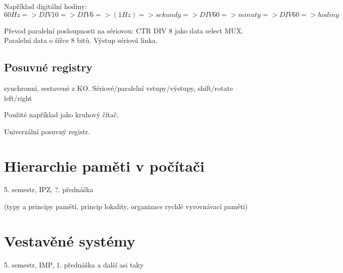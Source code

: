 \documentclass[a4paper, 11pt]{report}
\begin{document}
Například digitální hodiny: $60Hz => DIV 10 => DIV 6 => (1 Hz) => sekundy => DIV 60 => minuty => DIV 60 => hodiny$

Převod paralelní posloupnosti na sériovou: CTR DIV 8 jako data select MUX. Paralelní data o šířce 8 bitů. Výstup sériová linka.

\section{Posuvné registry}

synchronní, sestavené z KO. Sériové/paralelní vstupy/výstupy, shift/rotate left/right

Použité například jako kruhový čítač.

Univerzální posuvný registr.















\chapter{Hierarchie paměti v počítači} \label{cha:4}

5. semestr, IPZ, ?. přednáška

(typy a principy pamětí, princip lokality, organizace rychlé vyrovnávací paměti)





















\chapter{Vestavěné systémy} \label{cha:5}

5. semestr, IMP, 1. přednáška a další asi taky
\end{document}
